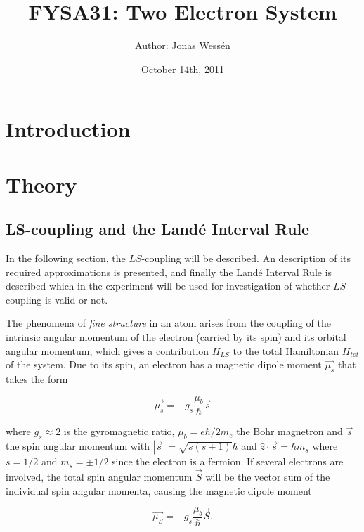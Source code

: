 \documentclass[a4paper]{article}
\title{\textbf{FYSA31:} Two Electron System}
\author{Author: Jonas Wess\'en}
\date{October 14th, 2011}
\begin{document}
\maketitle

\thispagestyle{empty}

\newpage

\section{Introduction}

\section{Theory}

\subsection{LS-coupling and the Land\'e Interval Rule}

In the following section, the $LS$-coupling will be described. An description of its required approximations is presented, and finally the Land\'e Interval Rule is described which in the experiment will be used for investigation of whether $LS$-coupling is valid or not.

The phenomena of \textit{fine structure} in an atom arises from the coupling of the intrinsic angular momentum of the electron (carried by its spin) and its orbital angular momentum, which gives a contribution $H_{LS}$ to the total Hamiltonian $H_{tot}$ of the system. Due to its spin, an electron has a magnetic dipole moment $\vec{\mu_s}$ that takes the form

\begin{equation}

\vec{\mu_s} = -g_s \frac{\mu_b}{\hbar} \vec{s}

\end{equation}

where $g_s \approx 2$ is the gyromagnetic ratio, $\mu_b = e \hbar / 2m_e$ the Bohr magnetron and $\vec{s}$ the spin angular momentum with $|\vec{s}|=\sqrt{s(s+1)} \hbar$ and $\hat{z} \cdot \vec{s} = \hbar m_s$ where $s=1/2$ and $m_s = \pm 1/2$ since the electron is a fermion. If several electrons are involved, the total spin angular momentum $\vec{S}$ will be the vector sum of the individual spin angular momenta, causing the magnetic dipole moment

\begin{equation}

\vec{\mu_S} = -g_s \frac{\mu_b}{\hbar} \vec{S}. \label{muS}

\end{equation}
\end{document}
